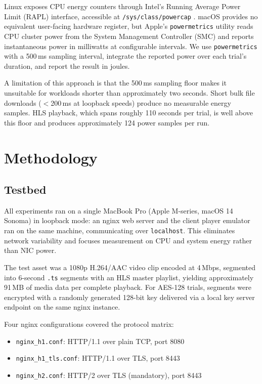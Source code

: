 \documentclass[conference]{IEEEtran}
\begin{document}
Linux exposes CPU energy counters through Intel's Running Average Power Limit (RAPL)
interface, accessible at \texttt{/sys/class/powercap} \cite{b_rapl}. macOS provides
no equivalent user-facing hardware register, but Apple's \texttt{powermetrics} utility
reads CPU cluster power from the System Management Controller (SMC) and reports
instantaneous power in milliwatts at configurable intervals. We use
\texttt{powermetrics} with a 500\,ms sampling interval, integrate the reported power
over each trial's duration, and report the result in joules.

A limitation of this approach is that the 500\,ms sampling floor makes it unsuitable
for workloads shorter than approximately two seconds. Short bulk file downloads
($<$200\,ms at loopback speeds) produce no measurable energy samples. HLS playback,
which spans roughly 110 seconds per trial, is well above this floor and produces
approximately 124 power samples per run.


\section{Methodology}

\subsection{Testbed}

All experiments ran on a single MacBook Pro (Apple M-series, macOS 14 Sonoma) in
loopback mode: an nginx web server and the client player emulator ran on the same
machine, communicating over \texttt{localhost}. This eliminates network variability
and focuses measurement on CPU and system energy rather than NIC power.

The test asset was a 1080p H.264/AAC video clip encoded at 4\,Mbps, segmented into
6-second \texttt{.ts} segments with an HLS master playlist, yielding approximately
91\,MB of media data per complete playback. For AES-128 trials, segments were
encrypted with a randomly generated 128-bit key delivered via a local key server
endpoint on the same nginx instance.

Four nginx configurations covered the protocol matrix:
\begin{itemize}
  \item \texttt{nginx\_h1.conf}: HTTP/1.1 over plain TCP, port 8080
  \item \texttt{nginx\_h1\_tls.conf}: HTTP/1.1 over TLS, port 8443
  \item \texttt{nginx\_h2.conf}: HTTP/2 over TLS (mandatory), port 8443
\end{itemize}
\end{document}
